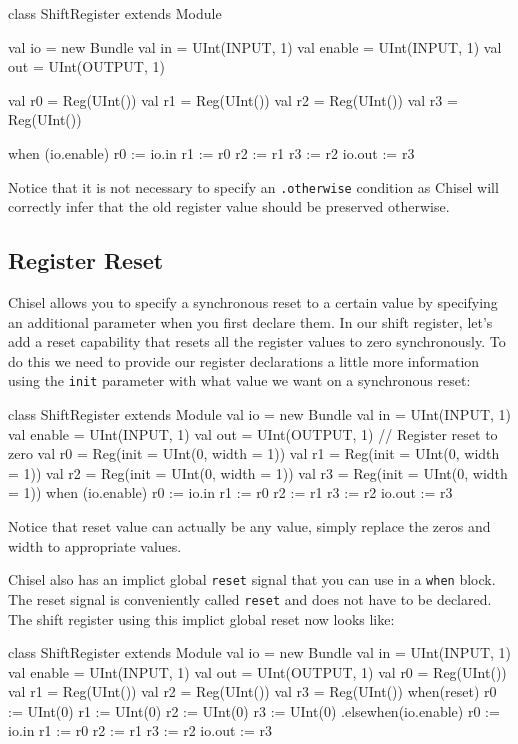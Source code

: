 \documentclass[twocolumn, 10pt]{article}
\begin{document}
\begin{scala}
class ShiftRegister extends Module {
  val io = new Bundle {
    val in     = UInt(INPUT, 1)
    val enable = UInt(INPUT, 1)
    val out    = UInt(OUTPUT, 1)
  }

  val r0 = Reg(UInt())
  val r1 = Reg(UInt())
  val r2 = Reg(UInt())
  val r3 = Reg(UInt())

  when (io.enable) {
    r0 := io.in
    r1 := r0
    r2 := r1
    r3 := r2
  }
  io.out := r3
}
\end{scala}

Notice that it is not necessary to specify an \verb+.otherwise+ condition as Chisel will correctly infer that the old register value should be preserved otherwise.

\subsection{Register Reset}

Chisel allows you to specify a synchronous reset to a certain value by specifying an additional parameter when you first declare them. In our shift register, let's add a reset capability that resets all the register values to zero synchronously. To do this we need to provide our register declarations a little more information using the \verb+init+ parameter with what value we want on a synchronous reset:

\begin{scala}
class ShiftRegister extends Module {
  val io = new Bundle {
    val in     = UInt(INPUT, 1)
    val enable = UInt(INPUT, 1)
    val out    = UInt(OUTPUT, 1)
  }
  // Register reset to zero
  val r0 = Reg(init = UInt(0, width = 1))
  val r1 = Reg(init = UInt(0, width = 1))
  val r2 = Reg(init = UInt(0, width = 1))
  val r3 = Reg(init = UInt(0, width = 1))
  when (io.enable) {
    r0 := io.in
    r1 := r0
    r2 := r1
    r3 := r2
  }
  io.out := r3
}
\end{scala}

Notice that reset value can actually be any value, simply replace the zeros and width to appropriate values.

Chisel also has an implict global \verb+reset+ signal that you can use in a \verb+when+ block. The reset signal is conveniently called \verb+reset+ and does not have to be declared. The shift register using this implict global reset now looks like:

\begin{scala}
class ShiftRegister extends Module {
  val io = new Bundle {
    val in     = UInt(INPUT, 1)
    val enable = UInt(INPUT, 1)
    val out    = UInt(OUTPUT, 1)
  }
  val r0 = Reg(UInt())
  val r1 = Reg(UInt())
  val r2 = Reg(UInt())
  val r3 = Reg(UInt())
  when(reset) {
    r0 := UInt(0)
    r1 := UInt(0)
    r2 := UInt(0)
    r3 := UInt(0)
  } .elsewhen(io.enable) {
    r0 := io.in
    r1 := r0
    r2 := r1
    r3 := r2
  }
  io.out := r3
}
\end{scala}
\end{document}
